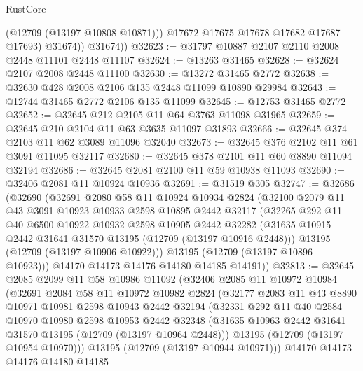 \begin{lexlean}{RustCore}
\begin{coremodule}
                (@12709 (@13197 @10808 @10871)))
              @17672
              @17675
              @17678
              @17682
              @17687
              @17693)
            @31674))
        @31674))
@32623 := @31797 @10887 @2107 @2110 @2008 @2448 @11101 @2448 @11107
@32624 := @13263 @31465
@32628 := @32624 @2107 @2008 @2448 @11100
@32630 := @13272 @31465 @2772
@32638 := @32630 @428 @2008 @2106 @135 @2448 @11099 @10890 @29984
@32643 := @12744 @31465 @2772 @2106 @135 @11099
@32645 := @12753 @31465 @2772
@32652 := @32645 @212 @2105 @11 @64 @3763 @11098 @31965
@32659 := @32645 @210 @2104 @11 @63 @3635 @11097 @31893
@32666 := @32645 @374 @2103 @11 @62 @3089 @11096 @32040
@32673 := @32645 @376 @2102 @11 @61 @3091 @11095 @32117
@32680 := @32645 @378 @2101 @11 @60 @8890 @11094 @32194
@32686 := @32645 @2081 @2100 @11 @59 @10938 @11093
@32690 := @32406 @2081 @11 @10924 @10936
@32691 := @31519 @305
@32747 := @32686
    (@32690
      (@32691
        @2080
        @58
        @11
        @10924
        @10934
        @2824
        (@32100
          @2079
          @11
          @43
          @3091
          @10923
          @10933
          @2598
          @10895
          @2442
          @32117
          (@32265
            @292
            @11
            @40
            @6500
            @10922
            @10932
            @2598
            @10905
            @2442
            @32282
            (@31635 @10915 @2442 @31641 @31570 @13195 (@12709 (@13197 @10916 @2448)))
            @13195
            (@12709 (@13197 @10906 @10922)))
          @13195
          (@12709 (@13197 @10896 @10923)))
        @14170
        @14173
        @14176
        @14180
        @14185
        @14191))
@32813 := @32645
    @2085
    @2099
    @11
    @58
    @10986
    @11092
    (@32406
      @2085
      @11
      @10972
      @10984
      (@32691
        @2084
        @58
        @11
        @10972
        @10982
        @2824
        (@32177
          @2083
          @11
          @43
          @8890
          @10971
          @10981
          @2598
          @10943
          @2442
          @32194
          (@32331
            @292
            @11
            @40
            @2584
            @10970
            @10980
            @2598
            @10953
            @2442
            @32348
            (@31635 @10963 @2442 @31641 @31570 @13195 (@12709 (@13197 @10964 @2448)))
            @13195
            (@12709 (@13197 @10954 @10970)))
          @13195
          (@12709 (@13197 @10944 @10971)))
        @14170
        @14173
        @14176
        @14180
        @14185

\end{coremodule}
\end{lexlean}
